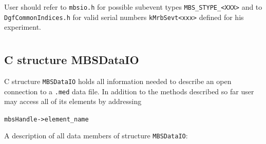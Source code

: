 \documentclass[10pt]{article}
\newenvironment{blueboxed}
	{\begin{Sbox}\begin{minipage}[t]}
	{\end{minipage}\end{Sbox}\colorbox{lightblue}{\TheSbox}}
\begin{document}
User should refer to \verb+mbsio.h+ for possible subevent types \verb+MBS_STYPE_<XXX>+
and to \verb+DgfCommonIndices.h+ for valid serial numbers \verb+kMrbSevt<xxx>+ defined for his experiment.
\newpage
\section{\appendixname}
\subsection{C structure MBSDataIO}
C structure \verb+MBSDataIO+ holds all information needed to describe an open connection to a \verb+.med+ data file.
In addition to the methods described so far user may access all of its elements by addressing
\begin{center}
\begin{blueboxed}{.3\linewidth}
\verb+mbsHandle->element_name+
\end{blueboxed}
\end{center}
A description of all data members of structure \verb+MBSDataIO+:
\end{document}
